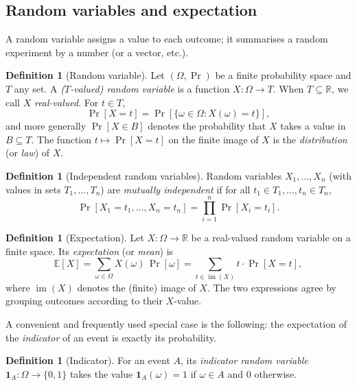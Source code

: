 \documentclass[11pt,a4paper]{article}
\theoremstyle{definition}
\newtheorem{definition}[theorem]{Definition}
\theoremstyle{remark}
\newcommand{\R}{\ensuremath{\mathbb{R}}}
\newcommand{\E}{\ensuremath{\mathbb{E}}}
\DeclareMathOperator{\img}{im}
\begin{document}
\subsection{Random variables and expectation}

A random variable assigns a value to each outcome; it summarises a random experiment by a number (or a vector, etc.).

\begin{definition}[Random variable]\label{probability:def-rv}
Let \((\Omega, \Pr)\) be a finite probability space and \(T\) any set. A \emph{(\(T\)-valued) random variable} is a function \(X\colon \Omega \to T\). When \(T \subseteq \R\), we call \(X\) \emph{real-valued}. For \(t \in T\),
\[
\Pr[X = t] = \Pr[\{\omega \in \Omega : X(\omega) = t\}],
\]
and more generally \(\Pr[X \in B]\) denotes the probability that \(X\) takes a value in \(B \subseteq T\). The function \(t \mapsto \Pr[X=t]\) on the finite image of \(X\) is the \emph{distribution} (or \emph{law}) of \(X\).
\end{definition}

\begin{definition}[Independent random variables]\label{probability:def-indep-rv}
Random variables \(X_1, \dots, X_n\) (with values in sets \(T_1, \dots, T_n\)) are \emph{mutually independent} if for all \(t_1 \in T_1, \dots, t_n \in T_n\),
\[
\Pr[X_1 = t_1, \dots, X_n = t_n] = \prod_{i=1}^n \Pr[X_i = t_i].
\]
\end{definition}

\begin{definition}[Expectation]\label{probability:def-exp}
Let \(X\colon \Omega \to \R\) be a real-valued random variable on a finite space. Its \emph{expectation} (or \emph{mean}) is
\[
\E[X] = \sum_{\omega \in \Omega} X(\omega)\,\Pr[\omega] = \sum_{t \in \img(X)} t \cdot \Pr[X = t],
\]
where \(\img(X)\) denotes the (finite) image of \(X\). The two expressions agree by grouping outcomes according to their \(X\)-value.
\end{definition}

A convenient and frequently used special case is the following: the expectation of the \emph{indicator} of an event is exactly its probability.

\begin{definition}[Indicator]\label{probability:def-indicator}
For an event \(A\), its \emph{indicator random variable} \(\mathbf{1}_A\colon \Omega \to \{0,1\}\) takes the value \(\mathbf{1}_A(\omega) = 1\) if \(\omega \in A\) and \(0\) otherwise.
\end{definition}
\end{document}

